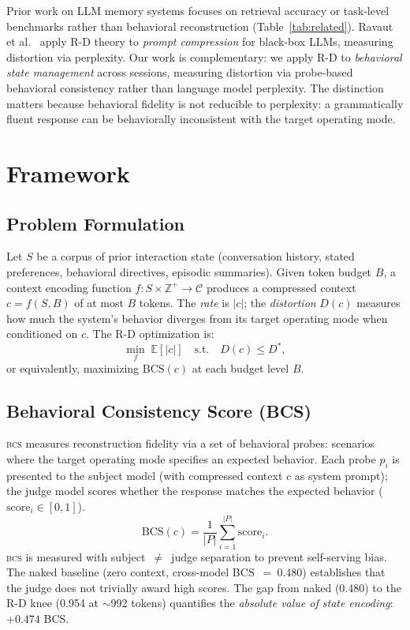 \documentclass[10pt,twocolumn]{article}
\newcommand{\bcs}{\textsc{bcs}}
\begin{document}
Prior work on LLM memory systems focuses on retrieval accuracy or
task-level benchmarks rather than behavioral reconstruction
(Table~\ref{tab:related}).
Ravaut et al.~\cite{ravaut2024} apply R-D theory to \emph{prompt compression}
for black-box LLMs, measuring distortion via perplexity.
Our work is complementary: we apply R-D to \emph{behavioral state
management} across sessions, measuring distortion via probe-based
behavioral consistency rather than language model perplexity.
The distinction matters because behavioral fidelity is not reducible to
perplexity: a grammatically fluent response can be behaviorally
inconsistent with the target operating mode.

\section{Framework}
\label{sec:framework}

\subsection{Problem Formulation}

Let $S$ be a corpus of prior interaction state (conversation history,
stated preferences, behavioral directives, episodic summaries).
Given token budget $B$, a context encoding function
$f: S \times \mathbb{Z}^+ \to \mathcal{C}$ produces a compressed context
$c = f(S, B)$ of at most $B$ tokens.
The \emph{rate} is $|c|$; the \emph{distortion} $D(c)$ measures how
much the system's behavior diverges from its target operating mode when
conditioned on $c$.
The R-D optimization is:
\begin{equation}
  \min_{f} \; \mathbb{E}[|c|] \quad \text{s.t.} \quad D(c) \leq D^*,
  \label{eq:rd}
\end{equation}
or equivalently, maximizing $\text{BCS}(c)$ at each budget level $B$.

\subsection{Behavioral Consistency Score (BCS)}

\bcs{} measures reconstruction fidelity via a set of behavioral probes:
scenarios where the target operating mode specifies an expected behavior.
Each probe $p_i$ is presented to the subject model (with compressed
context $c$ as system prompt); the judge model scores whether the
response matches the expected behavior ($\text{score}_i \in [0,1]$).
\begin{equation}
  \text{BCS}(c) = \frac{1}{|P|} \sum_{i=1}^{|P|} \text{score}_i.
  \label{eq:bcs}
\end{equation}
\bcs{} is measured with subject~$\neq$~judge separation to prevent
self-serving bias. The naked baseline (zero context, cross-model
BCS~$=~0.480$) establishes that the judge does not trivially award high
scores. The gap from naked (0.480) to the R-D knee (0.954 at $\sim$992
tokens) quantifies the \emph{absolute value of state encoding}: $+0.474$
BCS.
\end{document}
